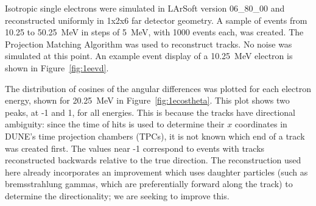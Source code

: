 Isotropic single electrons were simulated in LArSoft version 06\_80\_00 and reconstructed uniformly in 1x2x6 far detector geometry. A sample of events from 10.25 to 50.25~MeV in steps of 5~MeV, with 1000 events each, was created. The Projection Matching Algorithm was used to reconstruct tracks. No noise was simulated at this point. An example event display of a 10.25~MeV electron is shown in Figure~\ref{fig:1eevd}. 

The distribution of cosines of the angular differences was plotted for
each electron energy, shown for 20.25~MeV in
Figure~\ref{fig:1ecostheta}. This plot shows two peaks, at -1 and 1,
for all energies. This is because the tracks have directional
ambiguity: since the time of hits is used to determine their $x$
coordinates in DUNE's time projection chambers (TPCs), it is not known
which end of a track was created first. The values near -1 correspond
to events with tracks reconstructed backwards relative to the true
direction.  The reconstruction used here already incorporates an
improvement which uses daughter particles (such as bremsstrahlung
gammas, which are preferentially forward along the track) to determine
the directionality; we are seeking to improve this.


